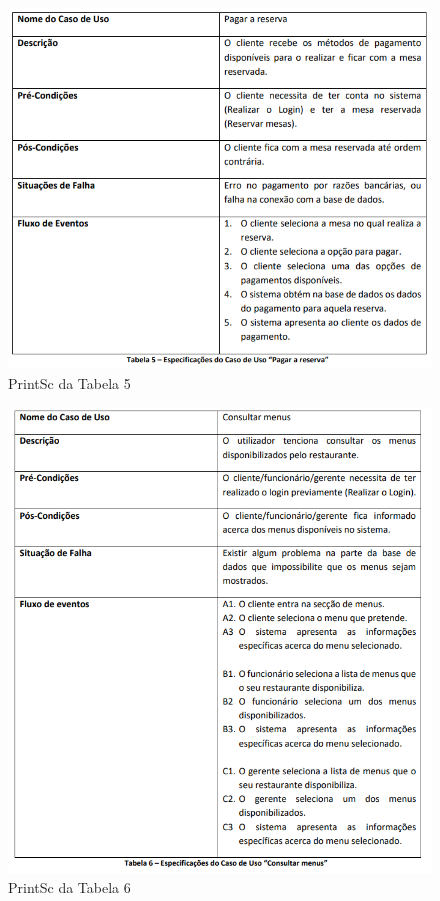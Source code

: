 \FloatBarrier
\begin{figure}[!hbt]
    \centering
    \includegraphics[width=14cm]{Resources/TablesPrintSc/5.png}
    \caption{PrintSc da Tabela 5}
    
\end{figure}
\FloatBarrier
\begin{figure}[!hbt]
    \centering
    \includegraphics[width=14cm]{Resources/TablesPrintSc/6.png}
    \caption{PrintSc da Tabela 6}
    
\end{figure}
